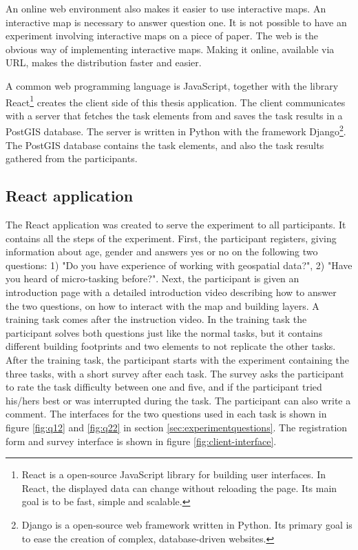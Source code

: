 An online web environment also makes it easier to use interactive maps. An interactive map is necessary to answer question one. It is not possible to have an experiment involving interactive maps on a piece of paper. The web is the obvious way of implementing interactive maps. Making it online, available via URL, makes the distribution faster and easier.

A common web programming language is JavaScript, together with the library React\footnote{React is a open-source JavaScript library for building user interfaces. In React, the displayed data can change without reloading the page. Its main goal is to be fast, simple and scalable.} creates the client side of this thesis application. The client communicates with a server that fetches the task elements from and saves the task results in a PostGIS database. The server is written in Python with the framework Django\footnote{Django is a open-source web framework written in Python. Its primary goal is to ease the creation of complex, database-driven websites.}. The PostGIS database contains the task elements, and also the task results gathered from the participants. 
 
\subsection{React application}
The React application was created to serve the experiment to all participants. It contains all the steps of the experiment. First, the participant registers, giving information about age, gender and answers yes or no on the following two questions: 1) "Do you have experience of working with geospatial data?", 2) "Have you heard of micro-tasking before?". Next, the participant is given an introduction page with a detailed introduction video describing how to answer the two questions, on how to interact with the map and building layers. A training task comes after the instruction video. In the training task the participant solves both questions just like the normal tasks, but it contains different building footprints and two elements to not replicate the other tasks. After the training task, the participant starts with the experiment containing the three tasks, with a short survey after each task. The survey asks the participant to rate the task difficulty between one and five, and if the participant tried his/hers best or was interrupted during the task. The participant can also write a comment. The interfaces for the two questions used in each task is shown in figure \ref{fig:q12} and \ref{fig:q22} in section \ref{sec:experimentquestions}. The registration form and survey interface is shown in figure \ref{fig:client-interface}. 

